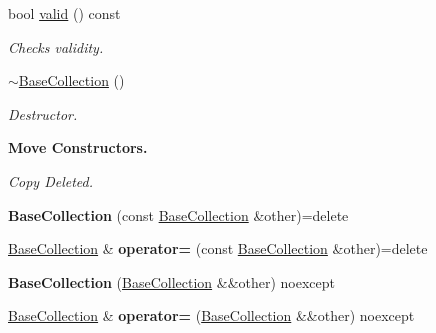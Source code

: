 \begin{DoxyCompactItemize}
bool \hyperlink{structblaze_1_1vkw_1_1base_1_1BaseCollection_a16ba74b297d8f157b47fc1335e79fb88}{valid} () const
\begin{DoxyCompactList}\small\item\em Checks validity. \end{DoxyCompactList}\item 
\hyperlink{structblaze_1_1vkw_1_1base_1_1BaseCollection_a17dacc1364ad11abd1c3589980e8f689}{$\sim$\+Base\+Collection} ()
\begin{DoxyCompactList}\small\item\em Destructor. \end{DoxyCompactList}\end{DoxyCompactItemize}
\begin{Indent}\textbf{ Move Constructors.}\par
{\em Copy Deleted. }\begin{DoxyCompactItemize}
\item 
\mbox{\label{structblaze_1_1vkw_1_1base_1_1BaseCollection_a9276c08c0fe56136b2847e8e09c8088f}} 
{\bfseries Base\+Collection} (const \hyperlink{structblaze_1_1vkw_1_1base_1_1BaseCollection}{Base\+Collection} \&other)=delete
\item 
\mbox{\label{structblaze_1_1vkw_1_1base_1_1BaseCollection_a8d9d207776dc00baea4196a0edbb6379}} 
\hyperlink{structblaze_1_1vkw_1_1base_1_1BaseCollection}{Base\+Collection} \& {\bfseries operator=} (const \hyperlink{structblaze_1_1vkw_1_1base_1_1BaseCollection}{Base\+Collection} \&other)=delete
\item 
\mbox{\label{structblaze_1_1vkw_1_1base_1_1BaseCollection_a182b96be903548e6ca98f8a2e038afdc}} 
{\bfseries Base\+Collection} (\hyperlink{structblaze_1_1vkw_1_1base_1_1BaseCollection}{Base\+Collection} \&\&other) noexcept
\item 
\mbox{\label{structblaze_1_1vkw_1_1base_1_1BaseCollection_a05e4a5f383861ea15aea85c78d4a8312}} 
\hyperlink{structblaze_1_1vkw_1_1base_1_1BaseCollection}{Base\+Collection} \& {\bfseries operator=} (\hyperlink{structblaze_1_1vkw_1_1base_1_1BaseCollection}{Base\+Collection} \&\&other) noexcept
\end{DoxyCompactItemize}
\end{Indent}
